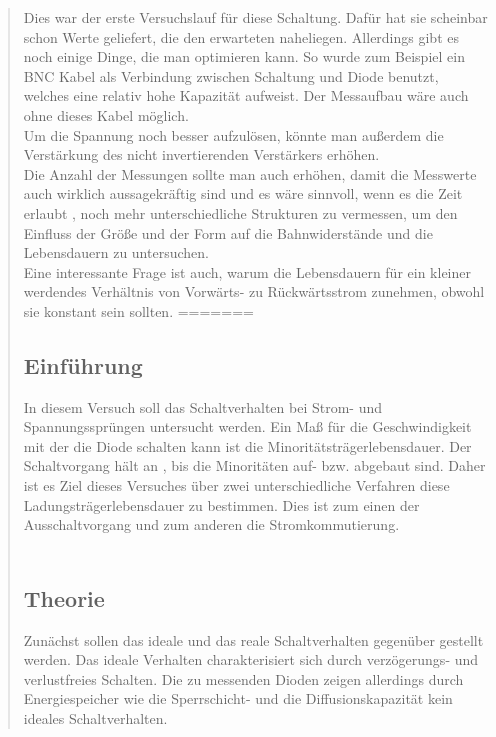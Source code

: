 \begin{quote}
     Dies war der erste Versuchslauf für diese Schaltung. Dafür hat sie
     scheinbar schon Werte geliefert, die den erwarteten naheliegen. Allerdings
     gibt es noch einige Dinge, die man optimieren kann. So wurde zum Beispiel
     ein BNC Kabel als Verbindung zwischen Schaltung und Diode benutzt, welches
     eine relativ hohe Kapazität aufweist. Der Messaufbau wäre auch ohne dieses
     Kabel möglich.\\
     Um die Spannung noch besser aufzulösen, könnte man außerdem die
     Verstärkung des nicht invertierenden Verstärkers erhöhen.\\
     Die Anzahl der Messungen sollte man auch erhöhen, damit die Messwerte auch
     wirklich aussagekräftig sind und es wäre sinnvoll, wenn es die Zeit erlaubt
     , noch mehr unterschiedliche Strukturen zu vermessen, um den Einfluss der
     Größe und der Form auf die Bahnwiderstände und die Lebensdauern zu
     untersuchen.\\
     Eine interessante Frage ist auch, warum die Lebensdauern für ein kleiner
     werdendes Verhältnis von Vorwärts- zu Rückwärtsstrom zunehmen, obwohl sie
     konstant sein sollten.
=======
	\subsection{Einführung}

	In diesem Versuch soll das Schaltverhalten bei Strom- und Spannungssprüngen
	untersucht werden. Ein Maß für die Geschwindigkeit mit der die Diode schalten
	kann ist die Minoritätsträgerlebensdauer. Der Schaltvorgang hält an
	, bis die Minoritäten auf- bzw. abgebaut sind. Daher ist es Ziel dieses
	Versuches über zwei unterschiedliche Verfahren diese Ladungsträgerlebensdauer
	zu bestimmen. Dies ist zum einen der Ausschaltvorgang und zum anderen
	die Stromkommutierung.\\
	\\

	\subsection{Theorie}

	Zunächst sollen das ideale und das reale Schaltverhalten gegenüber gestellt
	werden. Das ideale Verhalten charakterisiert sich durch verzögerungs- und
	verlustfreies Schalten. Die zu messenden Dioden zeigen allerdings durch
	Energiespeicher wie die Sperrschicht- und die Diffusionskapazität kein
	ideales Schaltverhalten. \\


\end{quote}
